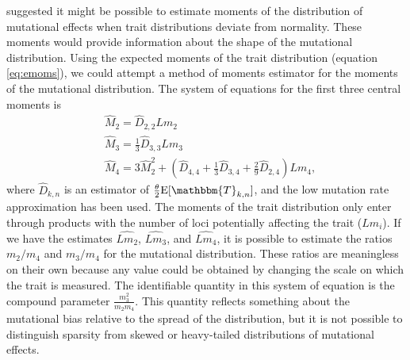 \citet{Schraiber2015} suggested it might be possible to estimate moments of the 
distribution of mutational effects when trait distributions deviate from
normality. These moments would provide information about the shape of the
mutational distribution. Using the expected moments of the trait distribution
(equation \eqref{eq:emoms}), we could attempt a method of moments estimator for
the moments of the mutational distribution. The system of equations for the
first three central moments is
\begin{align}
\label{eq:genearch}
  &\widehat{M}_2 = \widehat{D}_{2,2}Lm_2 \nonumber \\
  &\widehat{M}_3 = \frac{1}{3}\widehat{D}_{3,3}Lm_3 \nonumber \\
  &\widehat{M}_4 = 3\widehat{M}_2^2 + (\widehat{D}_{4,4} +
  \frac{1}{3} \widehat{D}_{3,4} + \frac{2}{9} \widehat{D}_{2,4})Lm_4,
\end{align}
where $\hat{D}_{k,n}$ is an estimator of $\T \E[\mathbbm{T}_{k,n}]$, and the low
mutation rate approximation has been used. The moments of the trait distribution
only enter through products with the number of loci potentially affecting the
trait ($Lm_i$). If we have the estimates $\widehat{Lm_2}$, $\widehat{Lm_3}$, and
$\widehat{Lm_4}$, it is possible to estimate the ratios $m_2/m_4$ and $m_3/m_4$
for the mutational distribution. These ratios are meaningless on their own
because any value could be obtained by changing the scale on which the trait is
measured. The identifiable quantity in this system of equation is the compound
parameter $\frac{m_3^2}{m_2m_4}$. This quantity reflects something about the
mutational bias relative to the spread of the distribution, but it is not
possible to distinguish sparsity from skewed or heavy-tailed distributions of
mutational effects.

